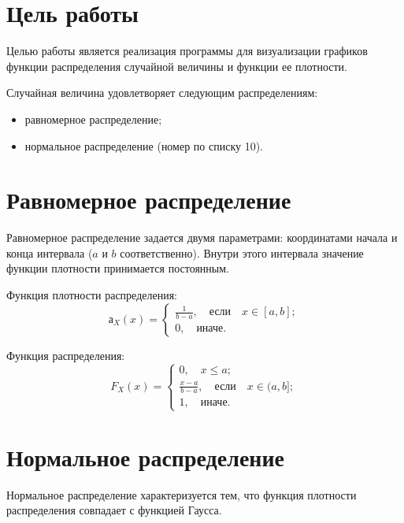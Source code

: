 \section*{Цель работы}

Целью работы является реализация программы для визуализации графиков
функции распределения случайной величины и функции ее плотности.

Случайная величина удовлетворяет следующим распределениям:
\begin{itemize}
    \item равномерное распределение;
    \item нормальное распределение (номер по списку 10).
\end{itemize}

\section*{Равномерное распределение}

Равномерное распределение задается двумя параметрами: координатами
начала и конца интервала ($a$ и $b$ соответственно). Внутри этого
интервала значение функции плотности принимается постоянным.

Функция плотности распределения:
\begin{equation*}
    а_X(x) = \begin{cases}
        \frac{1}{b - a},\quad\text{если}\quad x \in [a, b]; \\
                0,\quad\text{иначе}.
             \end{cases}
\end{equation*}

Функция распределения:
\begin{equation*}
    F_X(x) = \begin{cases}
                0,\quad x \le a; \\
                \frac{x - a}{b - a},\quad\text{если}\quad x \in (a, b]; \\
                1,\quad\text{иначе}.
             \end{cases}
\end{equation*}

\section*{Нормальное распределение}

Нормальное распределение характеризуется тем, что функция плотности
распределения совпадает с функцией Гаусса. 

